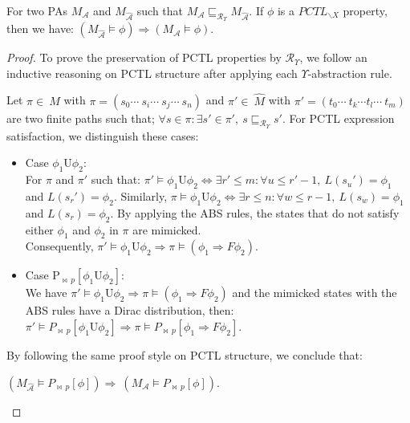 \begin{proposition}%
For two PAs $M_\mathcal{{A}}$ and $M_\mathcal{\widehat{A}}$ such that $M_\mathcal{{A}}\sqsubseteq_{\mathscr{R}_\Upsilon}M_\mathcal{{\widehat{A}}}$. If $\phi$ is a $PCTL_{\backslash X}$ property, then we have: $(M_\mathcal{\widehat{A}}\models\phi)\Rightarrow(M_\mathcal{{A}}\models\phi)$.
\end{proposition}
\begin{proof}
To prove the preservation of PCTL properties by $\mathscr{R}_\Upsilon$, we follow an inductive reasoning on PCTL structure after applying each $\Upsilon$-abstraction rule.


  Let $\pi\in~M$ with $\pi=(s_{0}\cdots~s_{i}\cdots~s_{j}\cdots~s_{n})$ and $\pi'\in~\widehat{M}$ with  $\pi'=(t_{0}\cdots~t_{k}\cdots t_{l}\cdots~t_{m})$ are two finite paths such that; $\forall s\in\pi:\exists s'\in\pi',~ s\sqsubseteq_{\mathscr{R}_\Upsilon}s'$.
For PCTL expression satisfaction, we distinguish these cases:
\begin{itemize}
  \item Case $\phi_{1}\mathrm{U}\phi_{2}$:\\
For $\pi$ and $\pi'$ such that:
  $\pi'\models \phi_{1}\mathrm{U}\phi_{2}\Leftrightarrow \exists r'\leq m:\forall u\leq r'-1,~ L(s_{u}')=\phi_{1}$ and $L(s_{r}')=\phi_{2}$. Similarly,
  $\pi\models \phi_{1}\mathrm{U}\phi_{2}\Leftrightarrow \exists r\leq n:\forall w\leq r-1,~ L(s_{w})=\phi_{1}$ and $L(s_{r})=\phi_{2}$. By applying the ABS rules, the states that do not satisfy either $\phi_{1}$ and $\phi_{2}$ in $\pi$ are mimicked. \\Consequently, $\pi'\models \phi_{1}\mathrm{U}\phi_{2}\Rightarrow\pi\models (\phi_{1}\Rightarrow F \phi_{2}).$
  \item Case $\mathrm{P}_{\bowtie\,p}[\phi_{1}\mathrm{U}\phi_{2}]$:\\
 We have $\pi'\models \phi_{1}\mathrm{U}\phi_{2}\Rightarrow\pi\models (\phi_{1}\Rightarrow F \phi_{2})$ and the mimicked states with the ABS rules have a Dirac distribution, then: $\pi'\models P_{\bowtie\,p}[\phi_{1}\mathrm{U}\phi_{2}]\Rightarrow\pi\models P_{\bowtie\,p}[\phi_{1}\Rightarrow F \phi_{2}]$.
\end{itemize}
By following the same proof style on PCTL structure, we conclude that:
  \begin{center}
  $(M_\mathcal{\widehat{A}}\models P_{\bowtie\,p}[\phi])\Rightarrow~(M_\mathcal{{A}}\models P_{\bowtie\,p}[\phi])$.
  \end{center}
\end{proof}



